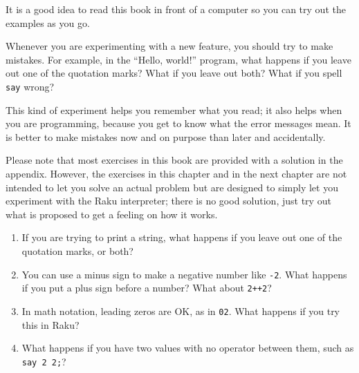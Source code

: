 \begin{exercise}

It is a good idea to read this book in front of a computer so you 
can try out the examples as you go.

Whenever you are experimenting with a new feature, you should try
to make mistakes.  For example, in the ``Hello, world!'' program,
what happens if you leave out one of the quotation marks?  What
if you leave out both?  What if you spell {\tt say} wrong?

This kind of experiment helps you remember what you read; it also
helps when you are programming, because you get to know what the error
messages mean.  It is better to make mistakes now and on purpose than
later and accidentally.

Please note that most exercises in this book are provided with 
a solution in the appendix. However, the exercises in this chapter   
and in the next chapter are not intended to let you solve an 
actual problem but are designed to simply let you experiment 
with the Raku interpreter; there is no good solution, just try 
out what is proposed to get a feeling on how it works.

\begin{enumerate}

\item If you are trying to print a string, what happens if you
leave out one of the quotation marks, or both?

\item You can use a minus sign to make a negative number like
{\tt -2}.  What happens if you put a plus sign before a number?
What about {\tt 2++2}?

\item In math notation, leading zeros are OK, as in {\tt 02}.
What happens if you try this in Raku?

\item What happens if you have two values with no operator
between them, such as {\tt say 2 2;}?

\end{enumerate}

\end{exercise}



